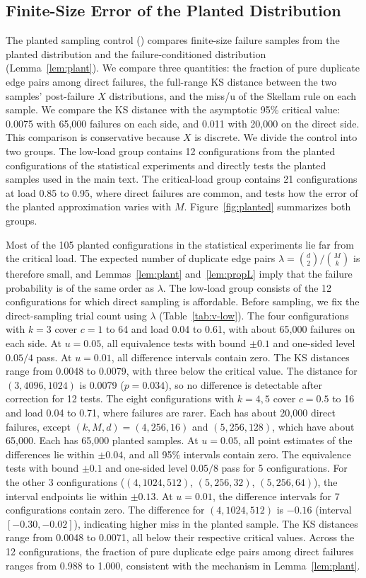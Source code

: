 \subsection{Finite-Size Error of the Planted Distribution}\label{app:planted}
The planted sampling control () compares finite-size failure samples from the planted distribution and the failure-conditioned distribution (Lemma~\ref{lem:plant}). We compare three quantities: the fraction of pure duplicate edge pairs among direct failures, the full-range KS distance between the two samples' post-failure $X$ distributions, and the miss/u of the Skellam rule on each sample. We compare the KS distance with the asymptotic 95\% critical value: 0.0075 with 65{,}000 failures on each side, and 0.011 with 20{,}000 on the direct side. This comparison is conservative because $X$ is discrete. We divide the control into two groups. The low-load group contains 12 configurations from the planted configurations of the statistical experiments and directly tests the planted samples used in the main text. The critical-load group contains 21 configurations at load 0.85 to 0.95, where direct failures are common, and tests how the error of the planted approximation varies with $M$. Figure~\ref{fig:planted} summarizes both groups.

Most of the 105 planted configurations in the statistical experiments lie far from the critical load. The expected number of duplicate edge pairs $\lambda=\binom d2/\binom Mk$ is therefore small, and Lemmas~\ref{lem:plant} and~\ref{lem:propL} imply that the failure probability is of the same order as $\lambda$. The low-load group consists of the 12 configurations for which direct sampling is affordable. Before sampling, we fix the direct-sampling trial count using $\lambda$ (Table~\ref{tab:v-low}). The four configurations with $k=3$ cover $c=1$ to 64 and load 0.04 to 0.61, with about 65{,}000 failures on each side. At $u=0.05$, all equivalence tests with bound $\pm0.1$ and one-sided level $0.05/4$ pass. At $u=0.01$, all difference intervals contain zero. The KS distances range from 0.0048 to 0.0079, with three below the critical value. The distance for $(3,4096,1024)$ is 0.0079 ($p=0.034$), so no difference is detectable after correction for 12 tests. The eight configurations with $k=4,5$ cover $c=0.5$ to 16 and load 0.04 to 0.71, where failures are rarer. Each has about 20{,}000 direct failures, except $(k,M,d)=(4,256,16)$ and $(5,256,128)$, which have about 65{,}000. Each has 65{,}000 planted samples. At $u=0.05$, all point estimates of the differences lie within $\pm0.04$, and all 95\% intervals contain zero. The equivalence tests with bound $\pm0.1$ and one-sided level $0.05/8$ pass for 5 configurations. For the other 3 configurations ($(4,1024,512)$, $(5,256,32)$, $(5,256,64)$), the interval endpoints lie within $\pm0.13$. At $u=0.01$, the difference intervals for 7 configurations contain zero. The difference for $(4,1024,512)$ is $-0.16$ (interval $[-0.30,-0.02]$), indicating higher miss in the planted sample. The KS distances range from 0.0048 to 0.0071, all below their respective critical values. Across the 12 configurations, the fraction of pure duplicate edge pairs among direct failures ranges from 0.988 to 1.000, consistent with the mechanism in Lemma~\ref{lem:plant}.

